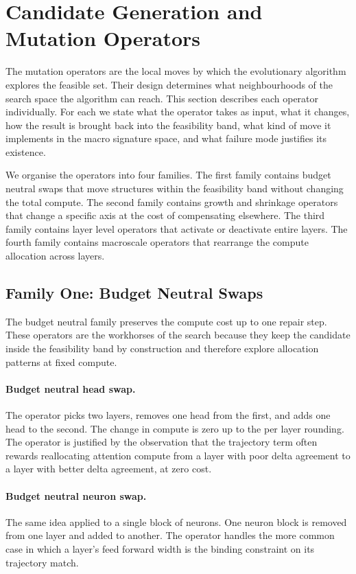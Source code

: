 \section{Candidate Generation and Mutation Operators}
\label{chap:operators}

The mutation operators are the local moves by which the evolutionary algorithm explores the feasible set. Their design determines what neighbourhoods of the search space the algorithm can reach. This section describes each operator individually. For each we state what the operator takes as input, what it changes, how the result is brought back into the feasibility band, what kind of move it implements in the macro signature space, and what failure mode justifies its existence.

We organise the operators into four families. The first family contains budget neutral swaps that move structures within the feasibility band without changing the total compute. The second family contains growth and shrinkage operators that change a specific axis at the cost of compensating elsewhere. The third family contains layer level operators that activate or deactivate entire layers. The fourth family contains macroscale operators that rearrange the compute allocation across layers.

\subsection{Family One: Budget Neutral Swaps}

The budget neutral family preserves the compute cost up to one repair step. These operators are the workhorses of the search because they keep the candidate inside the feasibility band by construction and therefore explore allocation patterns at fixed compute.

\paragraph{Budget neutral head swap.} The operator picks two layers, removes one head from the first, and adds one head to the second. The change in compute is zero up to the per layer rounding. The operator is justified by the observation that the trajectory term often rewards reallocating attention compute from a layer with poor delta agreement to a layer with better delta agreement, at zero cost.

\paragraph{Budget neutral neuron swap.} The same idea applied to a single block of neurons. One neuron block is removed from one layer and added to another. The operator handles the more common case in which a layer's feed forward width is the binding constraint on its trajectory match.

